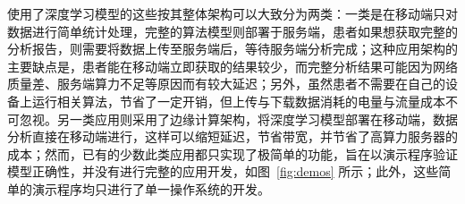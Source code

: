 使用了深度学习模型的这些\app 按其整体架构可以大致分为两类：一类是在移动端只对数据进行简单统计处理，完整的算法模型则部署于服务端\cite{wangJiyushenduxuexideyidongyuanchengxindianjiancexitongshejiyushixian2020,singhSmartECGMonitoring2022}，患者如果想获取完整的分析报告，则需要将数据上传至服务端后，等待服务端分析完成；这种应用架构的主要缺点是，患者能在移动端立即获取的结果较少，而完整分析结果可能因为网络质量差、服务端算力不足等原因而有较大延迟；另外，虽然患者不需要在自己的设备上运行相关算法，节省了一定开销，但上传与下载数据消耗的电量与流量成本不可忽视。另一类应用则采用了边缘计算架构，将深度学习模型部署在移动端，数据分析直接在移动端进行\cite{chenJiyushenduxuexidexindianfenximoxingdeshejiyuyouhua2021,liuJiyuyidongzhongduanfenxidekechuandairouxingxindianjiancexitong2021,wangEnablingSmartPersonalized2014,jinPredictingCardiovascularDisease2009}，这样可以缩短延迟，节省带宽，并节省了高算力服务器的成本；然而，已有的少数此类应用都只实现了极简单的功能，旨在以演示程序验证模型正确性，并没有进行完整的应用开发，如图~\ref{fig:demos} 所示；此外，这些简单的演示程序均只进行了单一操作系统的开发。

